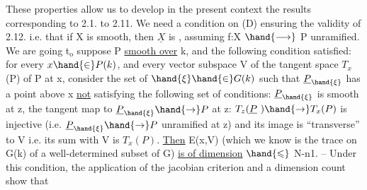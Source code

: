 These properties allow us to develop in the present context
the results corresponding to 2.1. to 2.11. We need a condition on (D)
ensuring the validity of 2.12. i.e. that if X is smooth, then $\underline{X}$ is
, assuming f:X $\hand{\longrightarrow}$ P unramified. We are going t$_{\mathrm{o}}$ suppose
 P \uline{smooth over} k, and the following condition satisfied: for
every $x \hand{\in} P(k)$, and every vector subspace V  of the tangent space
$T_x$(P) of P at x, consider the set  of $\hand{\xi} \hand{\in} G(k)$ such that
$\underline{P}_{\hand{\xi}}$ has a point above x 
\uline{not} satisfying the following set of conditions: $\underline{P}_{\hand{\xi}}$ is smooth at
z, 
the tangent map to $\underline{P}_{\hand{\xi}} \hand{\rightarrow} P$ at z: $T_z(\underline{P}\ ) \hand{\rightarrow} T_x(P)$ is injective
(i.e. $\underline{P}_{\hand{\xi}} \hand{\rightarrow} P$ unramified at z) and its image is ``transverse'' to V
i.e. its sum with V is $T_x(P)$. \uline{Then} E(x,V) (which we know
is the trace on G(k) of a well-determined   subset of G)
\uline{is of dimension} $\hand{\leqslant}$ N-n1. -- Under this condition,  the appli\unsure{:|-}cation
of the jacobian criterion and a dimension count show that
